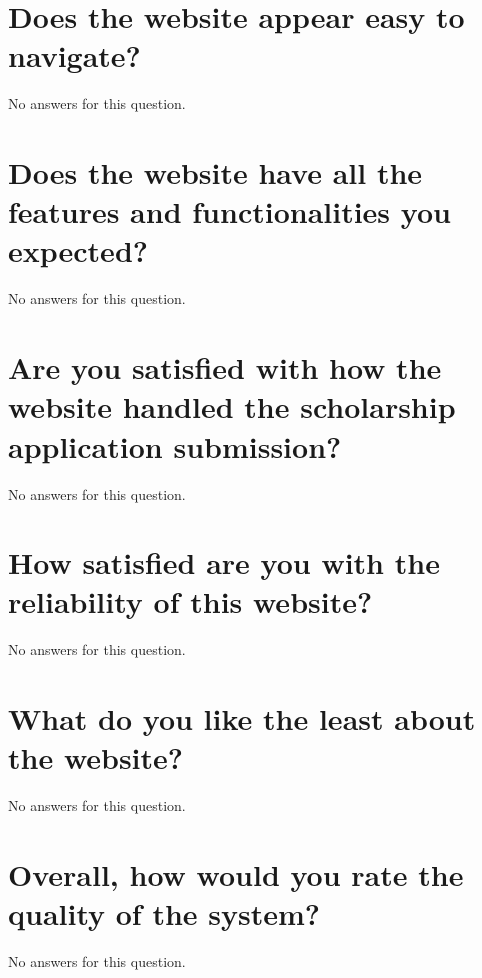 \documentclass[12pt]{article}
\date{November 25, 2023}
\begin{document}
\clearpage{}
\section{Does the website appear easy to navigate?}

\label{sec:1}

No answers for this question.


\clearpage{}
\section{Does the website have all the features and functionalities you expected?}

\label{sec:2}

No answers for this question.


\clearpage{}
\section{Are you satisfied with how the website handled the scholarship application submission?}

\label{sec:3}

No answers for this question.


\clearpage{}
\section{How satisfied are you with the reliability of this website?}

\label{sec:4}

No answers for this question.


\clearpage{}
\section{What do you like the least about the website?}

\label{sec:5}

No answers for this question.


\clearpage{}
\section{Overall, how would you rate the quality of the system?}

\label{sec:6}

No answers for this question.
\end{document}
